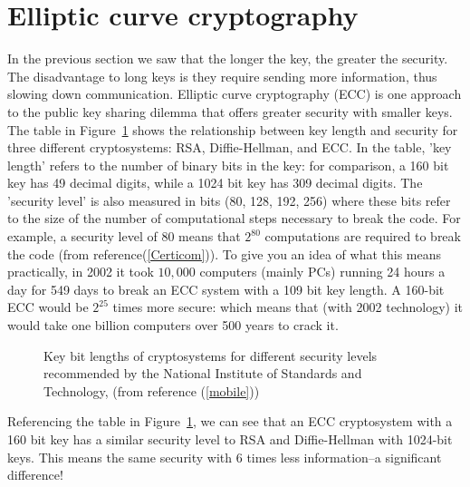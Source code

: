 \section{Elliptic curve cryptography}\label{sec:ECC:2}

In the previous section we saw that the longer the key, the greater the security. The disadvantage to long keys is they require sending more information, thus slowing down communication.  Elliptic curve cryptography (ECC) is one approach to the public key sharing dilemma that offers greater security with smaller keys. The table in Figure~\ref{fig:DH:DHKE_9} shows the relationship between key length and security for three different cryptosystems: RSA, Diffie-Hellman, and ECC.  In the table, 'key length' refers to the number of binary bits in the key: for comparison, a 160 bit key has 49 decimal digits, while a 1024 bit key has 309 decimal digits. The 'security level' is also measured in bits (80, 128, 192, 256) where these bits refer to the size of the number of computational steps necessary to break the code.  For example, a security level of 80 means that $2^{80}$ computations are required to break the code (from reference(\ref{Certicom})). To give you an idea of what this means practically, in 2002 it took $10,000$ computers (mainly PCs) running 24 hours a day for 549 days to break an ECC system with a 109 bit key length. A 160-bit ECC would be $2^{25}$ times more secure: which means that (with 2002 technology) it would take one billion computers over 500 years to crack it.
\begin{figure} [H]
	  \caption{\label{fig:DH:DHKE_9}Key bit lengths of cryptosystems for different security levels recommended by the National Institute of Standards and Technology, (from reference (\ref{mobile}))}
\end{figure}
Referencing the table in Figure~\ref{fig:DH:DHKE_9}, we can see that an ECC cryptosystem with a 160 bit key has a similar security level to RSA and Diffie-Hellman with 1024-bit keys. This means the same security with 6 times less information--a significant difference! 

